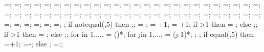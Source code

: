 {{\pversuppdepth=\pversuppdepth;
\pversupplinethk=\pversupplinethk;
\showpaxialspring=\showpaxialspring;
\paxialspringlength=\paxialspringlength;
\paxialspringsegm=\paxialspringsegm;
\paxialspringwidth=\paxialspringwidth;
\paxialspringlinethk=\paxialspringlinethk;
\paxialsuppwidth=\paxialsuppwidth;
\paxialsuppdepth=\paxialsuppdepth;
\paxialsupplinethk=\paxialsupplinethk;
\leftwspringspace=\leftwspringspace;
\leftwtextshiftx=\leftwtextshiftx;
\leftwtextshifty=\leftwtextshifty;
\leftwspringlength=\leftwspringlength;
\leftwampl=\leftwampl;
\leftwsegm=\leftwsegm;
\leftwspringthk=\leftwspringthk;
\leftwsuppwidth=\leftwsuppwidth;
\leftwsuppdepth=\leftwsuppdepth;
\leftwsupplinethk=\leftwsupplinethk;
\rightwspringspace=\rightwspringspace;
\rightwtextshiftx=\rightwtextshiftx;
\rightwtextshifty=\rightwtextshifty;
\rightwspringlength=\rightwspringlength;
\rightwampl=\rightwampl;
\rightwsegm=\rightwsegm;
\rightwspringthk=\rightwspringthk;
\rightwsuppwidth=\rightwsuppwidth;
\rightwsuppdepth=\rightwsuppdepth;
\rightwsupplinethk=\rightwsupplinethk;
\foundspringspace=\foundspringspace;
\foundtextshiftx=\foundtextshiftx;
\foundtextshifty=\foundtextshifty;
\foundspringlength=\foundspringlength;
\foundampl=\foundampl;
\foundsegm=\foundsegm;
\foundspringthk=\foundspringthk;
\foundsuppwidth=\foundsuppwidth;
\foundsuppdepth=\foundsuppdepth;
\foundsupplinethk=\foundsupplinethk;
\lefttriw=\lefttriw;
\leftlinew=\leftlinew;
\leftlined=\leftlined;
\leftlinet=\leftlinet;
\leftxvalue=\leftxvalue;
\leftyvalue=\leftyvalue;
\righttriw=\righttriw;
\rightlinew=\rightlinew;
\rightlined=\rightlined;
\rightlinet=\rightlinet;
\rightxvalue=\rightxvalue;
\rightyvalue=\rightyvalue;
\bottomtriw=\bottomtriw;
\bottomlinew=\bottomlinew;
\bottomlined=\bottomlined;
\bottomlinet=\bottomlinet;
\bottomxvalue=\bottomxvalue;
\bottomyvalue=\bottomyvalue;
;
%
if notequal(\showsupports,5) then {;};
%
\storyminone = ;
\columnnumber = \baynumber+1; %
\levelnumber = \storynumber+1; %
if \storynumber>1 then {\nlevmo = ;} else {;};
if \baynumber>1 then {\ncolmo = ;} else {;};
for \iii in {1,...,{\levelnumber}}{
\y{\iii} = ()*\storyheight;
for \j in {1,...,{\columnnumber}}{
\x{\j} = (\j-1)*\baywidth;
};
};
if equal(\showsupports,5) then
{=\subfloors+1;
\superstorynumber=\storynumber-\subfloors;}
else
{;
\superstorynumber=\storynumber;};
}}
